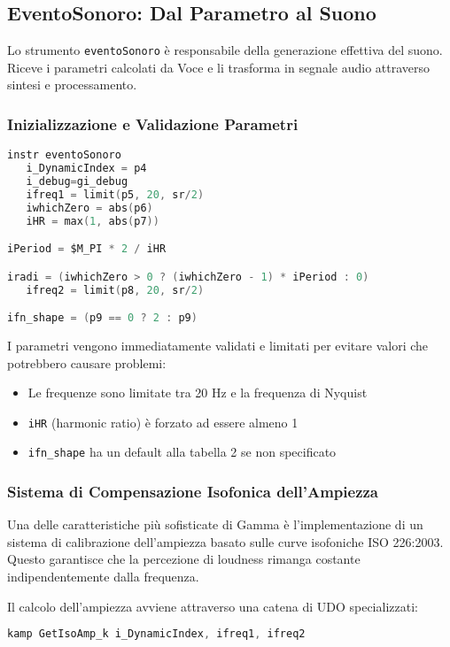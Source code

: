 \subsection{EventoSonoro: Dal Parametro al Suono}
Lo strumento \texttt{eventoSonoro} è responsabile della generazione effettiva del suono. Riceve i parametri calcolati da Voce e li trasforma in segnale audio attraverso sintesi e processamento.
\subsubsection{Inizializzazione e Validazione Parametri}
\begin{lstlisting}[language=C]
instr eventoSonoro
   i_DynamicIndex = p4
   i_debug=gi_debug
   ifreq1 = limit(p5, 20, sr/2)   
   iwhichZero = abs(p6)    
   iHR = max(1, abs(p7))

iPeriod = $M_PI * 2 / iHR

iradi = (iwhichZero > 0 ? (iwhichZero - 1) * iPeriod : 0)
   ifreq2 = limit(p8, 20, sr/2)

ifn_shape = (p9 == 0 ? 2 : p9)
\end{lstlisting}

I parametri vengono immediatamente validati e limitati per evitare valori che potrebbero causare problemi:
\begin{itemize}
    \item Le frequenze sono limitate tra 20 Hz e la frequenza di Nyquist
    \item \texttt{iHR} (harmonic ratio) è forzato ad essere almeno 1
    \item \texttt{ifn\_shape} ha un default alla tabella 2 se non specificato
\end{itemize}
\subsubsection{Sistema di Compensazione Isofonica dell'Ampiezza}
Una delle caratteristiche più sofisticate di Gamma è l'implementazione di un sistema di calibrazione dell'ampiezza basato sulle curve isofoniche ISO 226:2003. Questo garantisce che la percezione di loudness rimanga costante indipendentemente dalla frequenza.

Il calcolo dell'ampiezza avviene attraverso una catena di UDO specializzati:

\begin{lstlisting}[language=C]
kamp GetIsoAmp_k i_DynamicIndex, ifreq1, ifreq2
\end{lstlisting}

